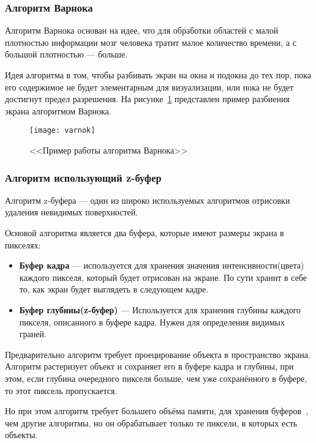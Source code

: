 \subsubsection{Алгоритм Варнока}

Алгоритм Варнока основан на идее, что для обработки областей с малой плотностью информации мозг человека тратит малое количество времени, а с большой плотностью — больше.

Идея алгоритма в том, чтобы разбивать экран на окна и подокна до тех пор, пока его содержимое не будет элементарным для визуализации, или пока не будет достигнут предел разрешения. На рисунке~\ref{fig:varnok} представлен пример разбиения экрана алгоритмом Варнока.

\begin{figure}[H]
	\centering
	\texttt{[image: varnok]}
	\caption{<<Пример работы алгоритма Варнока>>}
	\label{fig:varnok}
\end{figure}

\subsubsection{Алгоритм использующий z-буфер}
Алгоритм z-буфера — один из широко используемых алгоритмов отрисовки удаления невидимых поверхностей.

Основой алгоритма является два буфера, которые имеют размеры экрана в пикселях:

\begin{itemize}
	\item \textbf{Буфер кадра} — используется для хранения значения интенсивности(цвета) каждого пикселя, который будет отрисован на экране. По сути хранит в себе то, как экран будет выглядеть в следующем кадре.
	\item \textbf{Буфер глубины(z-буфер)} — Используется для хранения глубины каждого пикселя, описанного в буфере кадра. Нужен для определения видимых граней.
\end{itemize}

Предварительно алгоритм требует проецирование объекта в пространство экрана. Алгоритм растеризует объект и сохраняет его в буфере кадра и глубины, при этом, если глубина очередного пикселя больше, чем уже сохранённого в буфере, то этот пиксель пропускается.

Но при этом алгоритм требует большего объёма памяти, для хранения буферов~\cite{rodgers}, чем другие алгоритмы, но он обрабатывает только те пиксели, в которых есть объекты.

